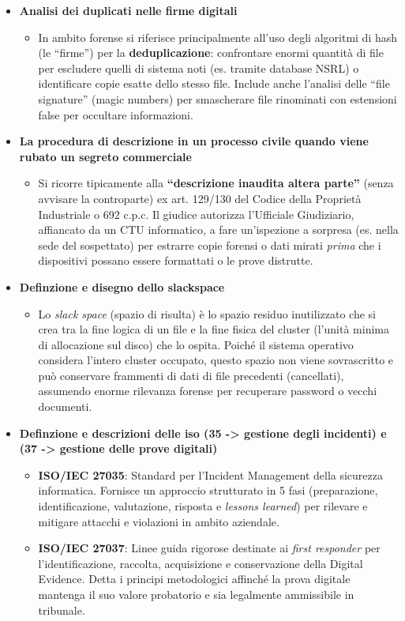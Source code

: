 \documentclass[11pt,a4paper]{article}
\begin{document}
\begin{itemize}
    \item \textbf{Analisi dei duplicati nelle firme digitali} 
    \begin{itemize}
        \item In ambito forense si riferisce principalmente all'uso degli algoritmi di hash (le ``firme'') per la \textbf{deduplicazione}: confrontare enormi quantità di file per escludere quelli di sistema noti (es. tramite database NSRL) o identificare copie esatte dello stesso file. Include anche l'analisi delle ``file signature'' (magic numbers) per smascherare file rinominati con estensioni false per occultare informazioni.
    \end{itemize}
    
    \item \textbf{La procedura di descrizione in un processo civile quando viene rubato un segreto commerciale} 
    \begin{itemize}
        \item Si ricorre tipicamente alla \textbf{``descrizione inaudita altera parte''} (senza avvisare la controparte) ex art. 129/130 del Codice della Proprietà Industriale o 692 c.p.c. Il giudice autorizza l'Ufficiale Giudiziario, affiancato da un CTU informatico, a fare un'ispezione a sorpresa (es. nella sede del sospettato) per estrarre copie forensi o dati mirati \textit{prima} che i dispositivi possano essere formattati o le prove distrutte.
    \end{itemize}
    
    \item \textbf{Definzione e disegno dello slackspace} 
    \begin{itemize}
        \item Lo \textit{slack space} (spazio di risulta) è lo spazio residuo inutilizzato che si crea tra la fine logica di un file e la fine fisica del cluster (l'unità minima di allocazione sul disco) che lo ospita. Poiché il sistema operativo considera l'intero cluster occupato, questo spazio non viene sovrascritto e può conservare frammenti di dati di file precedenti (cancellati), assumendo enorme rilevanza forense per recuperare password o vecchi documenti.
    \end{itemize}
    
    \item \textbf{Definzione e descrizioni delle iso (35 -> gestione degli incidenti) e (37 -> gestione delle prove digitali)}
    \begin{itemize}
        \item \textbf{ISO/IEC 27035}: Standard per l'Incident Management della sicurezza informatica. Fornisce un approccio strutturato in 5 fasi (preparazione, identificazione, valutazione, risposta e \textit{lessons learned}) per rilevare e mitigare attacchi e violazioni in ambito aziendale. 
        \item \textbf{ISO/IEC 27037}: Linee guida rigorose destinate ai \textit{first responder} per l'identificazione, raccolta, acquisizione e conservazione della Digital Evidence. Detta i principi metodologici affinché la prova digitale mantenga il suo valore probatorio e sia legalmente ammissibile in tribunale.
    \end{itemize}
\end{itemize}
\end{document}
